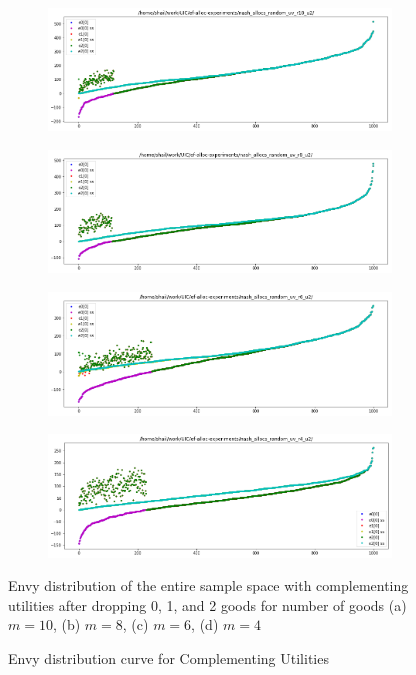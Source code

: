 \begin{figure}[h!]
  \centering
  \begin{subfigure}[b]{0.47\linewidth}
    \includegraphics[width=\linewidth]{images/compl/pdf_complementing_10.png}
    \caption{}
  \end{subfigure}
  \begin{subfigure}[b]{0.47\linewidth}
    \includegraphics[width=\linewidth]{images/compl/pdf_complementing_8.png}
    \caption{}
  \end{subfigure}
  \begin{subfigure}[b]{0.47\linewidth}
    \includegraphics[width=\linewidth]{images/compl/pdf_complementing_6.png}
    \caption{}
  \end{subfigure}
  \begin{subfigure}[b]{0.47\linewidth}
    \includegraphics[width=\linewidth]{images/compl/pdf_complementing_4.png}
    \caption{}
  \end{subfigure}
  \caption{Envy distribution curve for Complementing Utilities}
  \label{fig:efk}
  \small
    Envy distribution of the entire sample space with complementing utilities after dropping 0, 1, and 2 goods for number of goods (a) $m = 10$, (b) $m = 8$, (c) $m = 6$, (d) $m = 4$
\end{figure}

